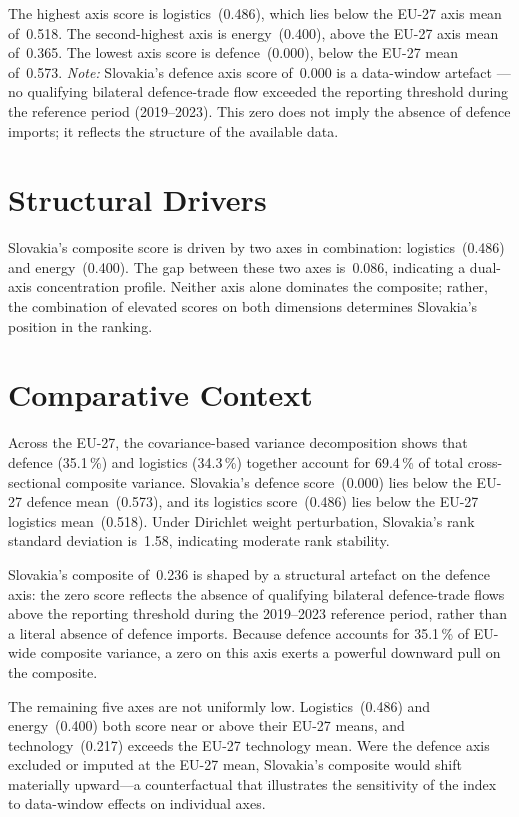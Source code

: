 \documentclass[12pt,a4paper]{article}
\begin{document}
The highest axis score is logistics~(0.486), which lies below the EU-27 axis mean of~0.518.  The second-highest axis is energy~(0.400), above the EU-27 axis mean of~0.365.  The lowest axis score is defence~(0.000), below the EU-27 mean of~0.573.  \emph{Note:}  Slovakia's defence axis score of~0.000 is a data-window artefact --- no qualifying bilateral defence-trade flow exceeded the reporting threshold during the reference period (2019--2023).  This zero does not imply the absence of defence imports; it reflects the structure of the available data.


\section{Structural Drivers}
\label{sec:drivers}

\begin{sloppypar}
Slovakia's composite score is driven by two axes in combination: logistics~(0.486) and energy~(0.400).  The gap between these two axes is~0.086, indicating a dual-axis concentration profile.  Neither axis alone dominates the composite; rather, the combination of elevated scores on both dimensions determines Slovakia's position in the ranking.
\end{sloppypar}


\section{Comparative Context}
\label{sec:comparative}

Across the EU-27, the covariance-based variance decomposition shows that defence (35.1\,\%) and logistics (34.3\,\%) together account for 69.4\,\% of total cross-sectional composite variance.  Slovakia's defence score~(0.000) lies below the EU-27 defence mean~(0.573), and its logistics score~(0.486) lies below the EU-27 logistics mean~(0.518).  Under Dirichlet weight perturbation, Slovakia's rank standard deviation is~1.58, indicating moderate rank stability.


Slovakia's composite of~0.236 is shaped by a structural artefact on the defence axis: the zero score reflects the absence of qualifying bilateral defence-trade flows above the reporting threshold during the 2019--2023 reference period, rather than a literal absence of defence imports.  Because defence accounts for 35.1\,\% of EU-wide composite variance, a zero on this axis exerts a powerful downward pull on the composite.

The remaining five axes are not uniformly low.  Logistics~(0.486) and energy~(0.400) both score near or above their EU-27 means, and technology~(0.217) exceeds the EU-27 technology mean.  Were the defence axis excluded or imputed at the EU-27 mean, Slovakia's composite would shift materially upward---a counterfactual that illustrates the sensitivity of the index to data-window effects on individual axes.
\end{document}
